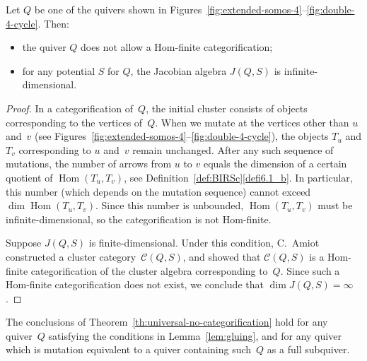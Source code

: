 \documentclass[ALCO,ThmDefs,Unicode,epreuves,published]{cedram}
\DeclareMathOperator{\Hom}{Hom}
\begin{document}


\begin{theorem}
\label{th:universal-no-categorification}
Let $Q$ be one of the quivers shown in Figures~\ref{fig:extended-somos-4}--\ref{fig:double-4-cycle}. 
Then:
\begin{itemize}%
\item
the quiver $Q$ does not allow a Hom-finite categorification; 
\item
for any potential $S$ for $Q$, the Jacobian algebra $J(Q,S)$ is infinite-dimensional.
\end{itemize}
\end{theorem}

\begin{proof}
In a categorification of~$Q$, the initial cluster consists of objects corresponding to the vertices of~$Q$. When we mutate at the vertices other than $u$ and~$v$ (see Figures~\ref{fig:extended-somos-4}--\ref{fig:double-4-cycle}), the objects $T_u$ and $T_v$ corresponding to $u$ and~$v$ remain unchanged. After any such sequence of mutations, the number of arrows from $u$ to $v$ equals the dimension of a certain quotient of $\Hom(T_u,T_v)$, see Definition~\ref{def:BIRSc}\ref{defi6.1_b}. 
In particular, this number (which depends on the mutation sequence) cannot exceed $\dim\Hom(T_u,T_v)$. 
Since this number is unbounded, $\Hom(T_u,T_v)$ must be infinite-dimensional, so the categorification is not Hom-finite. 

Suppose $J(Q,S)$ is finite-dimensional. Under this condition, 
C.~Amiot~\cite{amiot} constructed a cluster category~$\mathcal C(Q,S)$,
and showed that $\mathcal C(Q,S)$ is a Hom-finite categorification of the cluster algebra corresponding to~$Q$.
Since such a Hom-finite categorification does not exist, we conclude that $\dim J(Q,S)=\infty$. 
\end{proof}

The conclusions of Theorem~\ref{th:universal-no-categorification} hold for any quiver~$Q$ satisfying the conditions in Lemma~\ref{lem:gluing}, and for any quiver which is mutation equivalent to a quiver containing such~$Q$ as a full subquiver. 



\end{document}
